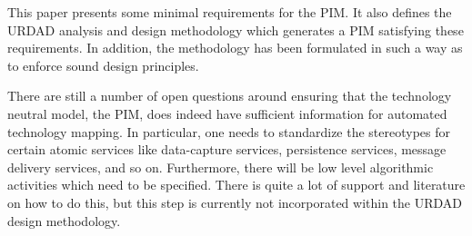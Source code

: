 \documentclass{IOS-Book-Article}
\begin{document}
This paper presents some minimal requirements for the PIM. It also defines
the URDAD analysis and design methodology which generates a PIM satisfying
these requirements. In addition, the methodology has been formulated in such a
 way as to enforce sound design principles.

There are still a number of open questions around ensuring that the technology
neutral model, the PIM, does indeed have sufficient information for automated
technology mapping. In particular, one needs to standardize the stereotypes for
certain atomic services like data-capture services, persistence services,
message delivery services, and so on. Furthermore, there will be low level
algorithmic activities which need to be specified. There is quite a lot of
support and literature on how to do this, but this step is currently not
incorporated within the URDAD design methodology.
\end{document}
